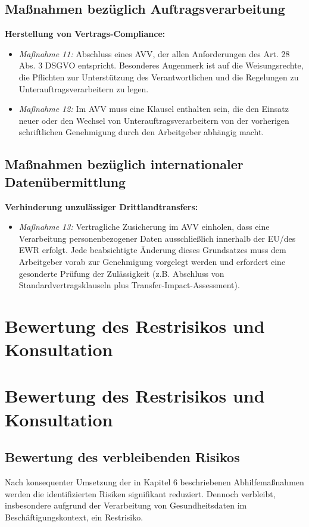 \documentclass[12pt, a4paper]{article}
\begin{document}
\subsection{Maßnahmen bezüglich Auftragsverarbeitung}
\textbf{Herstellung von Vertrags-Compliance:}
\begin{itemize}
    \item \textit{Maßnahme 11:} Abschluss eines AVV, der allen Anforderungen des Art. 28 Abs. 3 DSGVO entspricht. Besonderes Augenmerk ist auf die Weisungsrechte, die Pflichten zur Unterstützung des Verantwortlichen und die Regelungen zu Unterauftragsverarbeitern zu legen.
    \item \textit{Maßnahme 12:} Im AVV muss eine Klausel enthalten sein, die den Einsatz neuer oder den Wechsel von Unterauftragsverarbeitern von der vorherigen schriftlichen Genehmigung durch den Arbeitgeber abhängig macht.
\end{itemize}

\subsection{Maßnahmen bezüglich internationaler Datenübermittlung}
\textbf{Verhinderung unzulässiger Drittlandtransfers:}
\begin{itemize}
    \item \textit{Maßnahme 13:} Vertragliche Zusicherung im AVV einholen, dass eine Verarbeitung personenbezogener Daten ausschließlich innerhalb der EU/des EWR erfolgt. Jede beabsichtigte Änderung dieses Grundsatzes muss dem Arbeitgeber vorab zur Genehmigung vorgelegt werden und erfordert eine gesonderte Prüfung der Zulässigkeit (z.B. Abschluss von Standardvertragsklauseln plus Transfer-Impact-Assessment).
\end{itemize}

\section{Bewertung des Restrisikos und Konsultation}

\section{Bewertung des Restrisikos und Konsultation}

\subsection{Bewertung des verbleibenden Risikos}
Nach konsequenter Umsetzung der in Kapitel 6 beschriebenen Abhilfemaßnahmen werden die identifizierten Risiken signifikant reduziert. Dennoch verbleibt, insbesondere aufgrund der Verarbeitung von Gesundheitsdaten im Beschäftigungskontext, ein Restrisiko.
\end{document}

